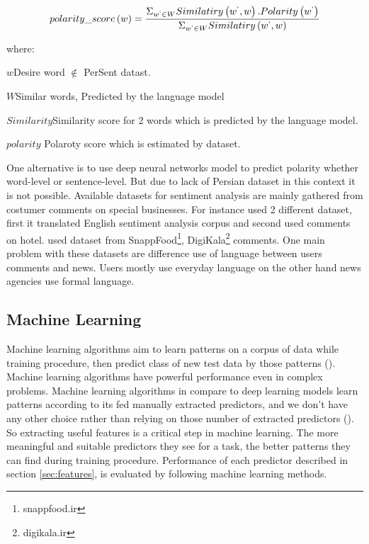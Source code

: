 \begin{equation}
	\label{eq_polar}
	polarity\_score\left(w\right) = \frac{\Sigma_{w^{`} \in W} Similatiry\left(w^{`}, w\right) . Polarity\left(w^{`}\right)}{\Sigma_{w^{`} \in W} Similatiry\left(w^{`}, w\right)}
\end{equation}

where: 
\begin{eqexpl}[25mm]
	\item{$w$}Desire word $\notin$ PerSent datast.
	\item{$W$}Similar words, Predicted by the language model
	\item{$Similarity$}Similarity score for 2 words which is predicted by the language model.
	\item{$polarity$} Polaroty score which is estimated by \cite{persent} dataset.
\end{eqexpl}

\bigbreak
One alternative is to use deep neural networks model to predict polarity whether word-level or sentence-level. But due to lack of Persian dataset in this context it is not possible. Available datasets for sentiment analysis are mainly gathered from costumer comments on special businesses. For instance \cite{polar_hotel} used 2 different dataset, first it translated English sentiment analysis corpus and second used comments on hotel. \cite{polar_servic} used dataset from SnappFood\footnote{snappfood.ir}, DigiKala\footnote{digikala.ir} comments. One main problem with these datasets are difference use of language between users comments and news. Users mostly use everyday language on the other hand news agencies use formal language.
\subsection{Machine Learning}
Machine learning algorithms aim to learn patterns on a corpus of data while training procedure, then predict class of new test data by those patterns (\cite{book_fake}). Machine learning algorithms have powerful performance even in complex problems. Machine learning algorithms in compare to deep learning models learn patterns according to its fed manually extracted predictors, and we don't have any other choice rather than relying on those number of extracted predictors (\cite{book_fake}). So extracting useful features  is a critical step in machine learning. The more meaningful and suitable predictors they see for a task, the better patterns they can find during training procedure. Performance of each predictor described in section \ref{sec:features}, is evaluated by following machine learning methods.   

